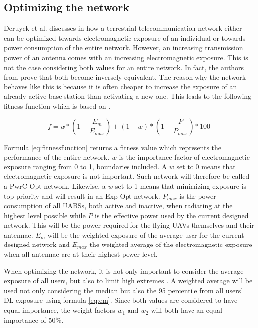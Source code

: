 \documentclass[twocolumn]{phdsymp} %
\begin{document}
\subsection{Optimizing the network}
Deruyck et al. discusses in \cite{J1} how a terrestrial  telecommunication network either can be optimized towards electromagnetic 
exposure of an individual or towards power consumption of the entire network. 
However, an increasing transmission power of an antenna comes with an increasing electromagnetic exposure. This is not the case considering
both values for an entire network. In fact, the authors from \cite{J1}  prove that both become inversely equivalent.
The reason why the network behaves like this is because it is often cheaper to increase the exposure of an already active base station 
than activating a new one. 
This leads to the following fitness function which is based on \cite{J1}.

\begin{equation} 
f = w * \left(1 - \frac{E_m}{E_{max}}\right) + (1 - w)*\left(1 - \frac{P}{P_{max}}\right) * 100
\label{eq:fitnessfunction}
\end{equation}

Formula \ref{eq:fitnessfunction} returns a fitness value which represents the performance of the entire network. 
$w$ is the importance factor of electromagnetic exposure ranging from 0 to 1, boundaries included. A $w$ set to 0 means that electromagnetic 
exposure is not important. Such network will therefore be called a \gls{PwrC Opt} network. 
Likewise, a $w$ set to 1 means that minimizing exposure is top priority and will result in an \gls{Exp Opt} network. $P_{max}$ is the power consumption of all UABSs, 
both active and inactive, when radiating at the highest level possible 
while $P$ is the effective power used by the current designed network. 
This will be the power required for the flying \gls{UAV}s themselves and their antennae.
$E_m$ will be the weighted exposure of the average user for the current designed network and $E_{max}$ the weighted average of the electromagnetic exposure when all antennae 
are at their highest power level.

When optimizing the network, it is not only important to consider the average exposure of all users, but also to limit high extremes \cite{J1}. A weighted average 
will be used not only considering the median but also the 95 percentile from all users' \gls{DL} exposure using formula \ref{eq:em}. 
Since both values are considered to have equal importance, the weight factors $w_1$ and $w_2$ will both have an equal importance of 50\%. 
\end{document}
